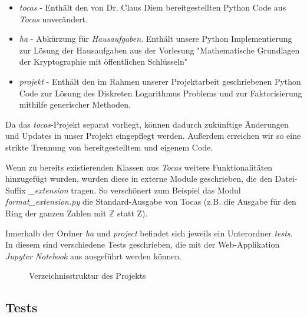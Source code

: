 \documentclass{scrartcl}
\begin{document}
\begin{itemize}
\item \emph{tocas} - Enthält den von Dr. Claus Diem bereitgestellten Python Code aus \emph{Tocas} \cite{tocas} unverändert.

\item \emph{ha} - Abkürzung für \emph{Hausaufgaben}. Enthält unsere Python Implementierung zur Lösung der Hausaufgaben aus der Vorlesung "Mathematische Grundlagen der Kryptographie mit öffentlichen Schlüsseln"
\item \emph{projekt} - Enthält den im Rahmen unserer Projektarbeit geschriebenen Python Code zur Lösung des Diskreten Logarithmus Problems und zur Faktorisierung mithilfe generischer Methoden.
\end{itemize}
Da das \emph{tocas}-Projekt separat vorliegt, können dadurch zukünftige Änderungen und Updates in unser Projekt eingepflegt werden. Außerdem erreichen wir so eine strikte Trennung von bereitgestelltem und eigenem Code.

Wenn zu bereits existierenden Klassen aus \emph{Tocas} weitere Funktionalitäten hinzugefügt wurden, wurden diese in externe Module geschrieben, die den Datei-Suffix \emph{\_extension} tragen. So verschönert zum Beispiel das Modul \emph{format\_extension.py} die Standard-Ausgabe von Tocas (z.B. die Ausgabe für den Ring der ganzen Zahlen mit \( \mathbb{Z} \) statt Z).

Innerhalb der Ordner \emph{ha} und \emph{project} befindet sich jeweils ein Unterordner \emph{tests}. In diesem sind verschiedene Tests geschrieben, die mit der Web-Applikation \emph{Jupyter Notebook} aus \cite{jupyterNotebook} ausgeführt werden können.

\begin{figure}[!h]
  \caption{Verzeichnisstruktur des Projekts}
  \label{fig:verzeichnisstruktur}
\end{figure}

\subsection{Tests}
\label{sec:tests}
\end{document}
